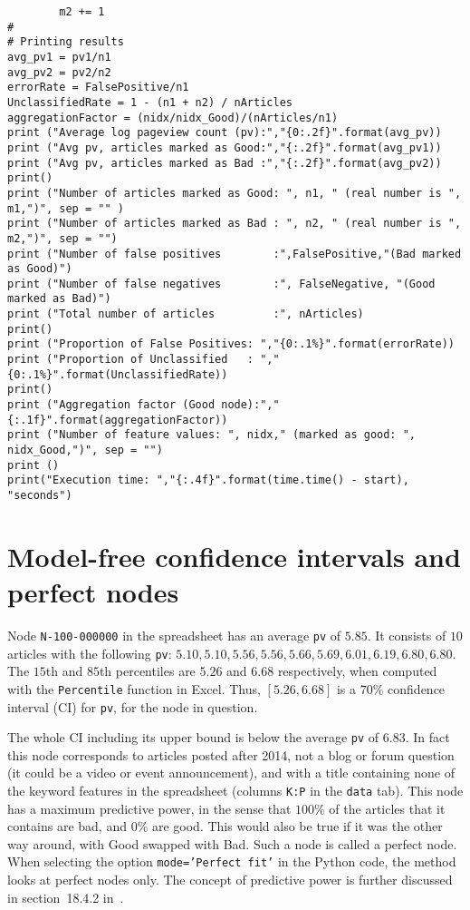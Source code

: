 \documentclass[oneside,10pt]{book}
\begin{document}
\begin{lstlisting}
        m2 += 1
#
# Printing results
avg_pv1 = pv1/n1
avg_pv2 = pv2/n2
errorRate = FalsePositive/n1
UnclassifiedRate = 1 - (n1 + n2) / nArticles
aggregationFactor = (nidx/nidx_Good)/(nArticles/n1)
print ("Average log pageview count (pv):","{0:.2f}".format(avg_pv))
print ("Avg pv, articles marked as Good:","{:.2f}".format(avg_pv1))
print ("Avg pv, articles marked as Bad :","{:.2f}".format(avg_pv2))
print()
print ("Number of articles marked as Good: ", n1, " (real number is ", m1,")", sep = "" )
print ("Number of articles marked as Bad : ", n2, " (real number is ", m2,")", sep = "")
print ("Number of false positives        :",FalsePositive,"(Bad marked as Good)")
print ("Number of false negatives        :", FalseNegative, "(Good marked as Bad)")
print ("Total number of articles         :", nArticles)
print()
print ("Proportion of False Positives: ","{0:.1%}".format(errorRate))
print ("Proportion of Unclassified   : ","{0:.1%}".format(UnclassifiedRate))
print()
print ("Aggregation factor (Good node):","{:.1f}".format(aggregationFactor))
print ("Number of feature values: ", nidx," (marked as good: ", nidx_Good,")", sep = "")
print ()
print("Execution time: ","{:.4f}".format(time.time() - start), "seconds")
\end{lstlisting}

\section{Model-free confidence intervals and perfect nodes}


Node \texttt{N-100-000000} in the spreadsheet has an average
\texttt{pv} of $5.85$. It consists of $10$ articles with
the following \texttt{pv}: $5.10, 5.10, 5.56, 5.56, 5.66, 5.69, 6.01,  6.19, 6.80, 6.80$. The $15$th and $85$th percentiles are $5.26$ and $6.68$ respectively, when computed with the \texttt{Percentile} function in Excel. Thus, $[5.26, 6.68]$ is a $70\%$ \textcolor{index}{confidence interval} (CI) for \texttt{pv}, for the node
 in question.


The whole CI including its upper bound is below the average \texttt{pv} of $6.83$. In fact this node corresponds to articles posted after 2014, not a blog or forum question (it could be a video or event announcement), and with a title containing none of the keyword features in the spreadsheet
(columns \texttt{K:P} in the \texttt{data} tab). This node  has a maximum predictive power, in the sense that $100\%$ of the articles that it contains are bad, and $0\%$
 are good. This would also be true if it was the other way around, with Good swapped with Bad. Such a node is called a \textcolor{index}{perfect node}. When selecting the option
\texttt{mode='Perfect fit'} in the Python code,
the method looks at perfect nodes only. The concept of \textcolor{index}{predictive power} is further discussed in section~18.4.2 in~\cite{vgelsevier}.
\end{document}
